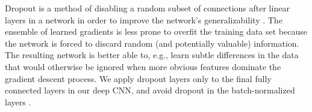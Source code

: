 \documentclass[fleqn,usenatbib]{mnras}
\begin{document}
Dropout is a method of disabling a random subset of connections after linear layers in a network in order to improve the network's generalizability \citep{dropout}.
The ensemble of learned gradients is less prone to overfit the training data set because the network is forced to discard random (and potentially valuable) information.
The resulting network is better able to, e.g., learn subtle differences in the data that would otherwise be ignored when more obvious features dominate the gradient descent process.
We apply dropout layers only to the final fully connected layers in our deep CNN, and avoid dropout in the batch-normalized layers \citep[as recommended by][]{batchnorm}.
%
\end{document}
